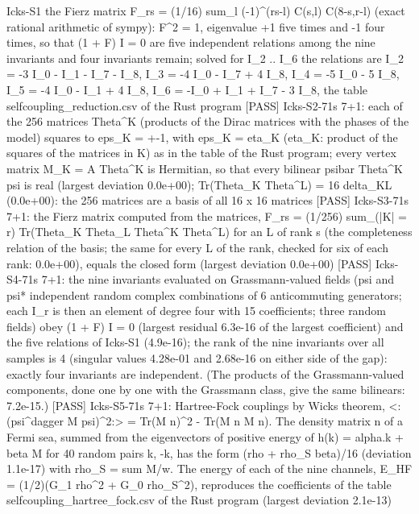 \documentclass[
  10pt,
]{article}
\newenvironment{Shaded}{}{}
\newcommand{\NormalTok}[1]{#1}
\begin{document}
\begin{Shaded}
\begin{Highlighting}[]
\NormalTok{[PASS] Icks{-}S1  the Fierz matrix F\_rs = (1/16) sum\_l ({-}1)\^{}(rs{-}l) C(s,l) C(8{-}s,r{-}l) (exact rational arithmetic of sympy): F\^{}2 = 1, eigenvalue +1 five times and {-}1 four times, so that (1 + F) I = 0 are five independent relations among the nine invariants and four invariants remain; solved for I\_2 .. I\_6 the relations are I\_2 = {-}3 I\_0 {-} I\_1 {-} I\_7 {-} I\_8, I\_3 = {-}4 I\_0 {-} I\_7 + 4 I\_8, I\_4 = {-}5 I\_0 {-} 5 I\_8, I\_5 = {-}4 I\_0 {-} I\_1 + 4 I\_8, I\_6 = {-}I\_0 + I\_1 + I\_7 {-} 3 I\_8, the table selfcoupling\_reduction.csv of the Rust program}
\NormalTok{[PASS] Icks{-}S2{-}71s  7+1: each of the 256 matrices Theta\^{}K (products of the Dirac matrices with the phases of the model) squares to eps\_K = +{-}1, with eps\_K = eta\_K (eta\_K: product of the squares of the matrices in K) as in the table of the Rust program; every vertex matrix M\_K = A Theta\^{}K is Hermitian, so that every bilinear psibar Theta\^{}K psi is real (largest deviation 0.0e+00); Tr(Theta\_K Theta\^{}L) = 16 delta\_KL (0.0e+00): the 256 matrices are a basis of all 16 x 16 matrices}
\NormalTok{[PASS] Icks{-}S3{-}71s  7+1: the Fierz matrix computed from the matrices, F\_rs = (1/256) sum\_(|K| = r) Tr(Theta\_K Theta\_L Theta\^{}K Theta\^{}L) for an L of rank s (the completeness relation of the basis; the same for every L of the rank, checked for six of each rank: 0.0e+00), equals the closed form (largest deviation 0.0e+00)}
\NormalTok{[PASS] Icks{-}S4{-}71s  7+1: the nine invariants evaluated on Grassmann{-}valued fields (psi and psi* independent random complex combinations of 6 anticommuting generators; each I\_r is then an element of degree four with 15 coefficients; three random fields) obey (1 + F) I = 0 (largest residual 6.3e{-}16 of the largest coefficient) and the five relations of Icks{-}S1 (4.9e{-}16); the rank of the nine invariants over all samples is 4 (singular values 4.28e{-}01 and 2.68e{-}16 on either side of the gap): exactly four invariants are independent. (The products of the Grassmann{-}valued components, done one by one with the Grassmann class, give the same bilinears: 7.2e{-}15.)}
\NormalTok{[PASS] Icks{-}S5{-}71s  7+1: Hartree{-}Fock couplings by Wick\textquotesingle{}s theorem, \textless{}:(psi\^{}dagger M psi)\^{}2:\textgreater{} = Tr(M n)\^{}2 {-} Tr(M n M n). The density matrix n of a Fermi sea, summed from the eigenvectors of positive energy of h(k) = alpha.k + beta M for 40 random pairs k, {-}k, has the form (rho + rho\_S beta)/16 (deviation 1.1e{-}17) with rho\_S = sum M/w. The energy of each of the nine channels, E\_HF = (1/2)(G\_1 rho\^{}2 + G\_0 rho\_S\^{}2), reproduces the coefficients of the table selfcoupling\_hartree\_fock.csv of the Rust program (largest deviation 2.1e{-}13)}

\end{Highlighting}
\end{Shaded}
\end{document}
